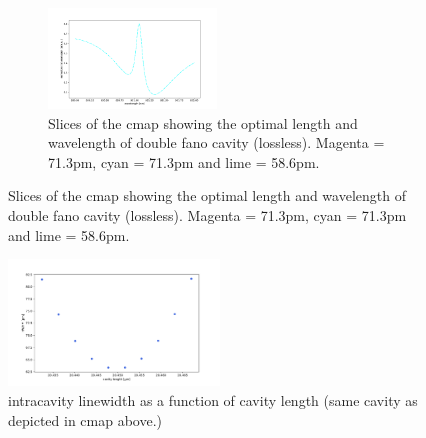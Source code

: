 \begin{figure}
\begin{subfigure}[c]{0.49\textwidth}
        \includegraphics[width=0.49\textwidth]{figures/cmap_slice3.pdf}
        \caption{Slices of the cmap showing the optimal length and wavelength of double fano cavity (lossless). Magenta = 71.3pm, cyan = 71.3pm and lime = 58.6pm.}
    \end{subfigure}
\end{figure}

\begin{figure}
    \centering
    \includegraphics[width=0.5\textwidth]{figures/cmap_lw_vs_l_intracavity.pdf}
    \caption{intracavity linewidth as a function of cavity length (same cavity as depicted in cmap above.)}
\end{figure}

